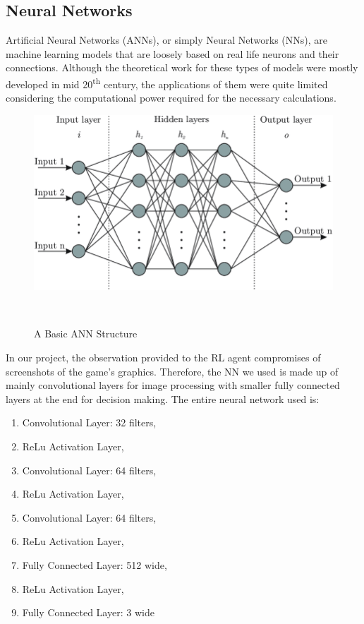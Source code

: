 \subsection{Neural Networks}
Artificial Neural Networks (ANNs), or simply Neural Networks (NNs), are
machine learning models that are loosely based on real life neurons and their connections.
Although the theoretical work for these types of models were mostly developed in mid
20\textsuperscript{th} century, the applications of them were quite limited considering
the computational power required for the necessary calculations.

\begin{figure}[h]
    \centering{}
    \includegraphics[width=\linewidth, height=0.3\textheight, keepaspectratio]{img/ann.png}
    \caption{A Basic ANN Structure~\autocite{buseyarentekin}}~\label{fig:ANN}
\end{figure}

In our project, the observation provided to the RL agent compromises of screenshots of
the game's graphics. Therefore, the NN we used is made up of mainly convolutional layers
for image processing with smaller fully connected layers at the end for decision making.
The entire neural network used is:
\begin{enumerate}
    \item Convolutional Layer: 32 filters,
    \item ReLu Activation Layer,
    \item Convolutional Layer: 64 filters,
    \item ReLu Activation Layer,
    \item Convolutional Layer: 64 filters,
    \item ReLu Activation Layer,
    \item Fully Connected Layer: 512 wide,
    \item ReLu Activation Layer,
    \item Fully Connected Layer: 3 wide
\end{enumerate}


